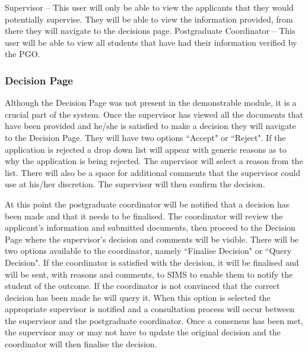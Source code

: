 \documentclass[journal]{IEEEtran}
\begin{document}
\hfill \break Supervisor – This user will only be able to view the applicants that they would potentially supervise. They will be able to view the information provided, from there they will navigate to the decisions page.
\hfill \break Postgraduate Coordinator – This user will be able to view all students that have had their information verified by the PGO. 
\hfill \break \subsubsection{Decision Page}
Although the Decision Page was not present in the demonstrable module, it is a crucial part of the system. Once the supervisor has viewed all the documents that have been provided and he/she is satisfied to make a decision they will navigate to the Decision Page. They will have two options ``Accept" or ``Reject". If the application is rejected a drop down list will appear with generic reasons as to why the application is being rejected. The supervisor will select a reason from the list. There will also be a space for additional comments that the supervisor could use at his/her discretion. The supervisor will then confirm the decision. 

\hfill \break At this point the postgraduate coordinator will be notified that a decision has been made and that it needs to be finalised. The coordinator will review the applicant's information and submitted documents, then proceed to the Decision Page where the supervisor's decision and comments will be visible. There will be two options available to the coordinator, namely ``Finalise Decision" or ``Query Decision". If the coordinator is satisfied with the decision, it will be finalised and will be sent, with reasons and comments, to SIMS to enable them to notify the student of the outcome. If the coordinator is not convinced that the correct decision has been made he will query it. When this option is selected the appropriate supervisor is notified and a consultation process will occur between the supervisor and the postgraduate coordinator. Once a consensus has been met, the supervisor may or may not have to update the original decision and the coordinator will then finalise the decision.


\clearpage
\thispagestyle{fancy}

\end{document}
